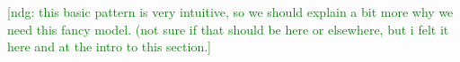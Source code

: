 \documentclass[doc]{apa6}
\newcommand{\ndg}[1]{\textcolor{Green}{[ndg: #1]}}
\begin{document}

\ndg{this basic pattern is very intuitive, so we should explain a bit more why we need this fancy model. (not sure if that should be here or elsewhere, but i felt it here and at the intro to this section.}




%  
\end{document}

